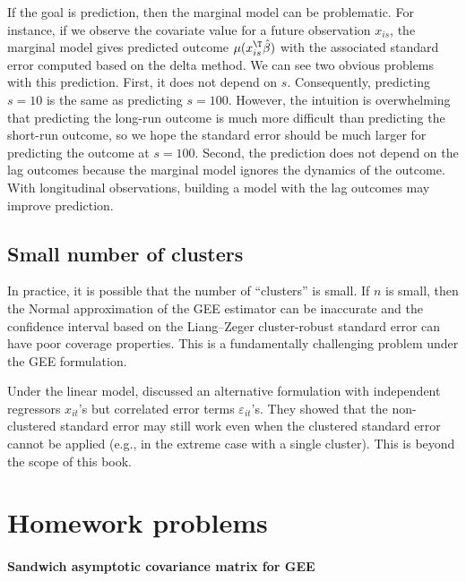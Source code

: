 If the goal is prediction, then the marginal model can be problematic. For instance, if we observe the covariate value for a future observation $x_{is}$, the marginal model gives predicted outcome $\mu(x_{is}^{\T} \hat\beta)$ with the associated standard error computed based on the delta method. We can see two obvious problems with this prediction. First, it does not depend on $s$. Consequently, predicting $s=10$ is the same as predicting $s=100$. However, the intuition is overwhelming that predicting the long-run outcome is much more difficult than predicting the short-run outcome, so we hope the standard error should be much larger for predicting the outcome at $s=100$. Second, the prediction does not depend on the lag outcomes because the marginal model ignores the dynamics of the outcome. With longitudinal observations, building a model with the lag outcomes may improve prediction. 


\subsection{Small number of clusters}



In practice, it is possible that the number of ``clusters'' is small. If $n$ is small, then the Normal approximation of the GEE estimator can be inaccurate and the confidence interval based on the Liang--Zeger cluster-robust standard error can have poor coverage properties. This is a fundamentally challenging problem under the GEE formulation. 

Under the linear model,  \citet{zhang2025random} discussed an alternative formulation with  independent regressors $x_{it}$'s but correlated error terms $\varepsilon_{it}$'s. They showed that the non-clustered standard error may still work even when the clustered standard error cannot be applied (e.g., in the extreme case with a single cluster). This is beyond the scope of this book. 







\section{Homework problems}

 

\paragraph{Sandwich asymptotic covariance matrix for GEE}\label{hw21::gee-sandwichvariance}

